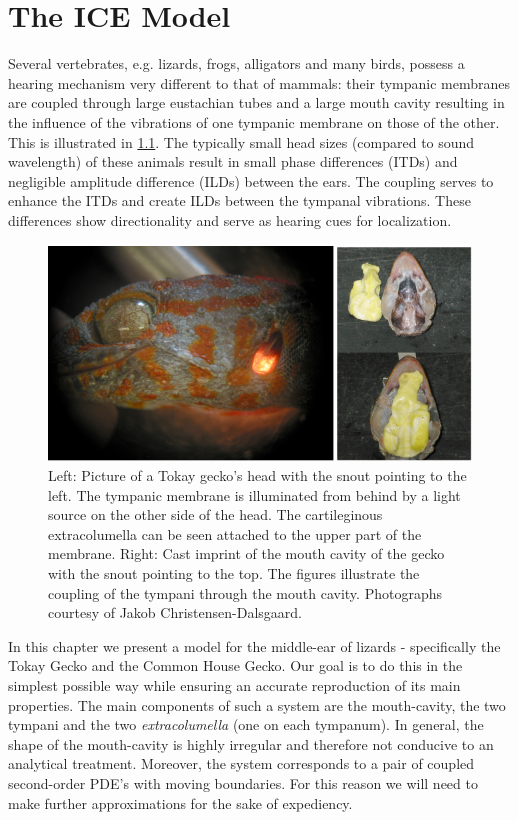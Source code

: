 \chapter{The ICE Model}
Several vertebrates, e.g. lizards, frogs, alligators and many birds, possess a hearing mechanism very different to
that of mammals: their tympanic membranes are coupled through large eustachian tubes and a large mouth cavity resulting in the influence of the vibrations of one tympanic membrane
on those of the other. This is illustrated in \ref{geckohead}. The typically small head sizes (compared to sound wavelength) of these animals result in
small phase differences (ITDs) and negligible amplitude difference (ILDs) between the ears. The coupling serves to enhance the ITDs and create ILDs
between the tympanal vibrations. These differences show directionality and serve as hearing cues for localization.

\begin{figure}[ht!]
 \centering
 \includegraphics[width=.85\linewidth]{Diagrams/geckohead1.png}
 \caption[Illustration of a gecko's head]{Left: Picture of a Tokay gecko's head with the snout pointing to the left. The tympanic membrane is illuminated from behind by
 a light source on the other side of the head. The cartileginous extracolumella can be seen attached to the upper part of the membrane.
 Right: Cast imprint of the mouth cavity of the gecko with the snout pointing to the top. The figures illustrate the coupling of the tympani through the mouth cavity.
 Photographs courtesy of Jakob Christensen-Dalsgaard.}
  \label{geckohead}
\end{figure}

In this chapter we present a model for the
middle-ear of lizards - specifically the Tokay Gecko and the Common House Gecko. Our goal is to do this in the simplest possible way while ensuring an accurate reproduction of its main properties. 
The main components of such a 
system are the mouth-cavity, the two tympani and the two \textit{extracolumella} (one on each tympanum). In general, the shape of the mouth-cavity is highly irregular and therefore
not conducive to an analytical treatment. Moreover, the system corresponds to a pair of coupled second-order PDE's with
moving boundaries. For this reason we will need to make further approximations for the sake of expediency.

